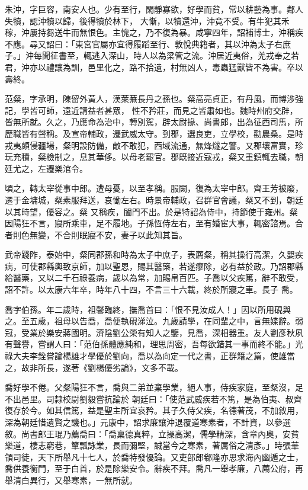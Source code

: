 \begin{pinyinscope}
 朱沖，字巨容，南安人也。少有至行，閑靜寡欲，好學而貧，常以耕藝為事。鄰人失犢，認沖犢以歸，後得犢於林下，
 大慚，以犢還沖，沖竟不受。有牛犯其禾稼，沖屢持芻送牛而無恨色。主愧之，乃不復為暴。咸寧四年，詔補博士，沖稱疾不應。尋又詔曰：「東宮官屬亦宜得履蹈至行、敦悅典籍者，其以沖為太子右庶子。」沖每聞征書至，輒逃入深山，時人以為梁管之流。沖居近夷俗，羌戎奉之若君，沖亦以禮讓為訓，邑里化之，路不拾遺，村無凶人，毒蟲猛獸皆不為害。卒以壽終。



 范粲，字承明，陳留外黃人，漢萊蕪長丹之孫也。粲高亮貞正，有丹風，而博涉強記，學皆可師，遠近請益者甚眾，
 性不矜莊，而見之皆肅如也。魏時州府交辟，皆無所就。久之，乃應命為治中，轉別駕，辟太尉掾、尚書郎，出為征西司馬，所歷職皆有聲稱。及宣帝輔政，遷武威太守。到郡，選良吏，立學校，勸農桑。是時戎夷頗侵疆場，粲明設防備，敵不敢犯，西域流通，無烽燧之警。又郡壤富實，珍玩充積，粲檢制之，息其華侈。以母老罷官。郡既接近寇戎，粲又重鎮輒去職，朝廷尤之，左遷樂涫令。



 頃之，轉太宰從事中郎。遭母憂，以至孝稱。服闕，復為太宰中郎。齊王芳被廢，遷于金墉城，粲素服拜送，哀慟左右。時景帝輔政，召群官會議，粲又不到，朝廷以其時望，優容之。粲
 又稱疾，闔門不出。於是特詔為侍中，持節使于雍州。粲因陽狂不言，寢所乘車，足不履地。子孫恆侍左右，至有婚宦大事，輒密諮焉。合者則色無變，不合則眠寢不安，妻子以此知其旨。



 武帝踐阼，泰始中，粲同郡孫和時為太子中庶子，表薦粲，稱其操行高潔，久嬰疾病，可使郡縣輿致京師，加以聖恩，賜其醫藥，若遂瘳除，必有益於政。乃詔郡縣給醫藥，又以二千石祿養病，歲以為常，加賜帛百匹。子喬以父疾篤，辭不敢受，詔不許。以太康六年卒，時年八十四，不言三十六載，終於所寢之車。長子
 喬。



 喬字伯孫。年二歲時，祖馨臨終，撫喬首曰：「恨不見汝成人！」因以所用硯與之。至五歲，祖母以告喬，喬便執硯涕泣。九歲請學，在同輩之中，言無媟辭。弱冠，受業於樂安蔣國明。濟陰劉公榮有知人之鑒，見喬，深相器重。友人劉彥秋夙有聲譽，嘗謂人曰：「范伯孫體應純和，理思周密，吾每欲錯其一事而終不能。」光祿大夫李銓嘗論楊雄才學優於劉向，喬以為向定一代之書，正群籍之篇，使雄當之，故非所長，遂著《劉楊優劣論》，文多不載。



 喬好學不倦。父粲陽狂不言，喬與二弟並棄學業，絕人事，侍疾家庭，至粲沒，足不出邑里。司隸校尉劉毅嘗抗論於
 朝廷曰：「使范武威疾若不篤，是為伯夷、叔齊復存於今。如其信篤，益是聖主所宜哀矜。其子久侍父疾，名德著茂，不加敘用，深為朝廷惜遺賢之譏也。」元康中，詔求廉讓沖退覆道寒素者，不計資，以參選敘。尚書郎王琨乃薦喬曰：「喬稟德真粹，立操高潔，儒學精深，含章內奧，安貧樂道，棲志窮巷，簞瓢詠業，長而彌堅，誠當今之寒素，著厲俗之清彥。」時張華領司徒，天下所舉凡十七人，於喬特發優論。又吏部郎郗隆亦思求海內幽遁之士，喬供養衡門，至于白首，於是除樂安令。辭疾不拜。喬凡一舉孝廉，八薦公府，再舉清白異行，又舉寒素，一無所就。




\end{pinyinscope}
